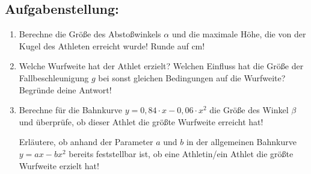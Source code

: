 \begin{langesbeispiel}
\subsection{Aufgabenstellung:}
\begin{enumerate}
	\item Berechne die Größe des Abstoßwinkels $\alpha$ und die maximale Höhe, die von der Kugel des Athleten erreicht wurde! Runde auf cm!
	
	\item Welche Wurfweite hat der Athlet erzielt? Welchen Einfluss hat die Größe der Fallbeschleunigung $g$ bei sonst gleichen Bedingungen auf die Wurfweite? Begründe deine Antwort!
	
	\item Berechne für die Bahnkurve $y=0,84\cdot x-0,06\cdot x^2$ die Größe des Winkel $\beta$ und überprüfe, ob dieser Athlet die größte Wurfweite erreicht hat!
	
	Erläutere, ob anhand der Parameter $a$ und $b$ in der allgemeinen Bahnkurve $y=ax-bx^2$ bereits feststellbar ist, ob eine Athletin/ein Athlet die größte Wurfweite erzielt hat!	
						\end{enumerate}\leer
				
\end{langesbeispiel}
